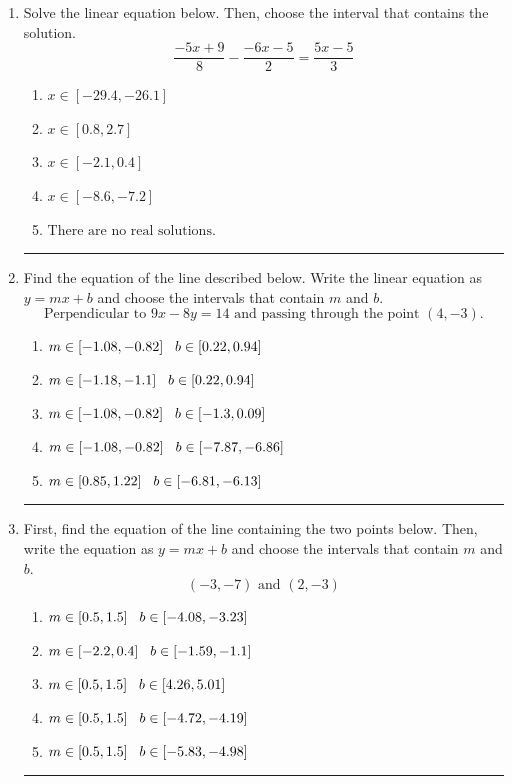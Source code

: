 \documentclass[14pt]{extbook}
\newcommand{\litem}[1]{\item#1\hspace*{-1cm}\rule{\textwidth}{0.4pt}}
\begin{document}
\begin{enumerate}
{\begin{enumerate}[label=\Alph*.]
\end{enumerate} }
\litem{
Solve the linear equation below. Then, choose the interval that contains the solution.\[ \frac{-5x + 9}{8} - \frac{-6x -5}{2} = \frac{5x -5}{3} \]\begin{enumerate}[label=\Alph*.]
\item \( x \in [-29.4, -26.1] \)
\item \( x \in [0.8, 2.7] \)
\item \( x \in [-2.1, 0.4] \)
\item \( x \in [-8.6, -7.2] \)
\item \( \text{There are no real solutions.} \)

\end{enumerate} }
\litem{
Find the equation of the line described below. Write the linear equation as $ y=mx+b $ and choose the intervals that contain $m$ and $b$.\[ \text{Perpendicular to } 9 x - 8 y = 14 \text{ and passing through the point } (4, -3). \]\begin{enumerate}[label=\Alph*.]
\item \( m \in [-1.08, -0.82] \hspace*{3mm} b \in [0.22, 0.94] \)
\item \( m \in [-1.18, -1.1] \hspace*{3mm} b \in [0.22, 0.94] \)
\item \( m \in [-1.08, -0.82] \hspace*{3mm} b \in [-1.3, 0.09] \)
\item \( m \in [-1.08, -0.82] \hspace*{3mm} b \in [-7.87, -6.86] \)
\item \( m \in [0.85, 1.22] \hspace*{3mm} b \in [-6.81, -6.13] \)

\end{enumerate} }
\litem{
First, find the equation of the line containing the two points below. Then, write the equation as $ y=mx+b $ and choose the intervals that contain $m$ and $b$.\[ (-3, -7) \text{ and } (2, -3) \]\begin{enumerate}[label=\Alph*.]
\item \( m \in [0.5, 1.5] \hspace*{3mm} b \in [-4.08, -3.23] \)
\item \( m \in [-2.2, 0.4] \hspace*{3mm} b \in [-1.59, -1.1] \)
\item \( m \in [0.5, 1.5] \hspace*{3mm} b \in [4.26, 5.01] \)
\item \( m \in [0.5, 1.5] \hspace*{3mm} b \in [-4.72, -4.19] \)
\item \( m \in [0.5, 1.5] \hspace*{3mm} b \in [-5.83, -4.98] \)


\end{enumerate}}
\end{enumerate}
\end{document}
